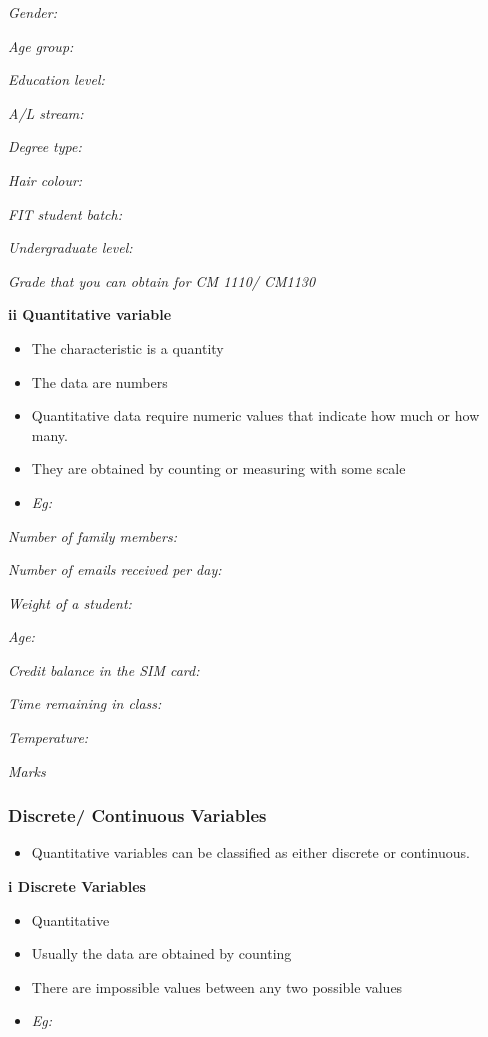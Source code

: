\documentclass[]{book}
\providecommand{\tightlist}{%
  \setlength{\itemsep}{0pt}\setlength{\parskip}{0pt}}
\begin{document}
\emph{Gender:}

\emph{Age group:}

\emph{Education level:}

\emph{A/L stream:}

\emph{Degree type:}

\emph{Hair colour: }

\emph{FIT student batch:}

\emph{Undergraduate level:}

\emph{Grade that you can obtain for CM 1110/ CM1130}

\textbf{ii Quantitative variable }

\begin{itemize}
\tightlist
\item
  The characteristic is a quantity
\item
  The data are numbers
\item
  Quantitative data require numeric values that indicate how much or how many.
\item
  They are obtained by counting or measuring with some scale
\item
  \emph{Eg: }
\end{itemize}

\emph{Number of family members:}

\emph{Number of emails received per day:}

\emph{Weight of a student:}

\emph{Age:}

\emph{Credit balance in the SIM card:}

\emph{Time remaining in class:}

\emph{Temperature:}

\emph{Marks }

\hypertarget{discrete-continuous-variables}{%
\subsubsection{Discrete/ Continuous Variables}\label{discrete-continuous-variables}}

\begin{itemize}
\tightlist
\item
  Quantitative variables can be classified as either discrete or continuous.
\end{itemize}

\textbf{i Discrete Variables}

\begin{itemize}
\tightlist
\item
  Quantitative
\item
  Usually the data are obtained by counting
\item
  There are impossible values between any two possible values
\item
  \emph{Eg:}
\end{itemize}
\end{document}
